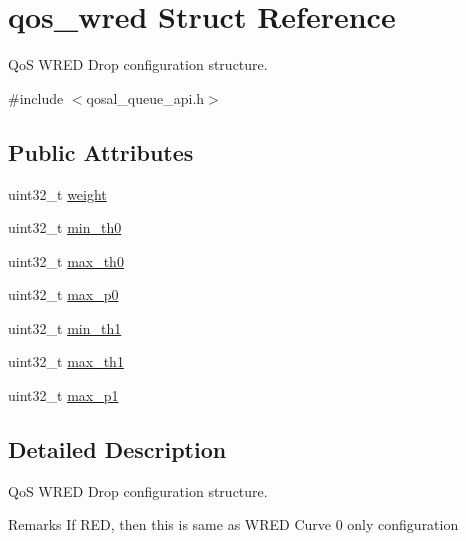 \hypertarget{structqos__wred}{\section{qos\-\_\-wred Struct Reference}
\label{structqos__wred}
}


Qo\-S W\-R\-E\-D Drop configuration structure.  




{\ttfamily \#include $<$qosal\-\_\-queue\-\_\-api.\-h$>$}

\subsection*{Public Attributes}
\begin{DoxyCompactItemize}
\item 
uint32\-\_\-t \hyperlink{structqos__wred_ad24e5f107f4f64ef4db622e8d456b65c}{weight}
\item 
uint32\-\_\-t \hyperlink{structqos__wred_ac49810c9d53aa8638bcdd24a2ec13d7f}{min\-\_\-th0}
\item 
uint32\-\_\-t \hyperlink{structqos__wred_a348045f227c28243a2399d45db0d144c}{max\-\_\-th0}
\item 
uint32\-\_\-t \hyperlink{structqos__wred_acc7d45f6204665b61a572a8ab338a5da}{max\-\_\-p0}
\item 
uint32\-\_\-t \hyperlink{structqos__wred_a0a66c03609dbfb8e9cd41605c4f1343d}{min\-\_\-th1}
\item 
uint32\-\_\-t \hyperlink{structqos__wred_ae7542f270e832e26f5bd6cc1abd5b75c}{max\-\_\-th1}
\item 
uint32\-\_\-t \hyperlink{structqos__wred_a10a26159a7b75615c704cf85a53201b6}{max\-\_\-p1}
\end{DoxyCompactItemize}


\subsection{Detailed Description}
Qo\-S W\-R\-E\-D Drop configuration structure. 

\begin{DoxyRemark}{Remarks}
If R\-E\-D, then this is same as W\-R\-E\-D Curve 0 only configuration 
\end{DoxyRemark}


